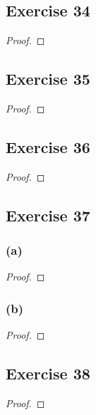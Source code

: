 \documentclass[14pt]{extarticle}
\begin{document}
\subsection{Exercise 34}

\begin{proof}

\end{proof}

\subsection{Exercise 35}

\begin{proof}

\end{proof}

\subsection{Exercise 36}

\begin{proof}

\end{proof}

\subsection{Exercise 37}
\subsubsection{(a)}

\begin{proof}

\end{proof}

\subsubsection{(b)}

\begin{proof}

\end{proof}

\subsection{Exercise 38}

\begin{proof}

\end{proof}
\end{document}
